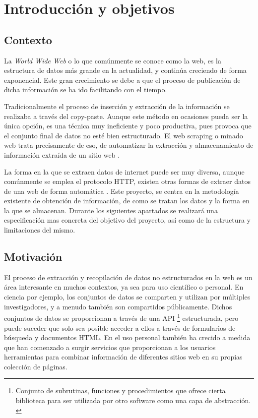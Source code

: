 \chapter{Introducción y objetivos}
\label{cha:introduccion y objetivos}

\section{Contexto}
\label{sec:contexto}

La \textit{World Wide Web} o lo que comúnmente se conoce como la web, es la estructura de datos más
grande en la actualidad, y continúa creciendo de forma exponencial. Este gran crecimiento se debe a que el
proceso de publicación de dicha información se ha ido facilitando con el tiempo.

Tradicionalmente el proceso de inserción y extracción de la información se realizaba a través del
copy-paste. Aunque este método en ocasiones pueda ser la única opción, es una técnica muy ineficiente y 
poco productiva, pues provoca que el conjunto final de datos no esté bien estructurado. El web scraping 
o minado web trata precisamente de eso, de automatizar la extracción y almacenamiento de información
extraída de un sitio web \cite{web-scraping-wikipedia}.

La forma en la que se extraen datos de internet puede ser muy diversa, aunque comúnmente se emplea el
protocolo HTTP, existen otras formas de extraer datos de una web de forma automática
\cite{web-scraping-bozhao}. Este proyecto, se centra en la metodología existente de obtención de
información, de como se tratan los datos y la forma en la que se almacenan. Durante los siguientes
apartados se realizará una especificación mas concreta del objetivo del proyecto, así como de la
estructura y limitaciones del mismo.

\section{Motivación}
\label{sec:motivacion}

El proceso de extracción y recopilación de datos no estructurados en la web es un área interesante en
muchos contextos, ya sea para uso científico o personal. En ciencia por ejemplo, los conjuntos de datos
se comparten y utilizan por múltiples investigadores, y a menudo también  son compartidos públicamente.
Dichos conjuntos de datos se proporcionan a través de una API \footnote{Conjunto de subrutinas, funciones
y procedimientos que ofrece cierta biblioteca para ser utilizada por otro software como una capa de
abstracción. \cite{api-wikipedia}} estructurada, pero puede suceder que solo sea posible acceder a ellos 
a través de formularios de búsqueda y documentos HTML. En el uso personal también ha crecido a medida 
que han comenzado a surgir servicios que proporcionan a los usuarios herramientas para combinar información 
de diferentes sitios web en su propias colección de páginas.

